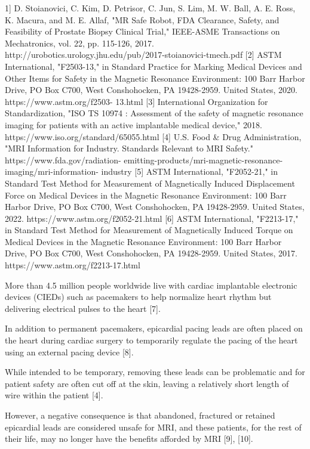 1] D. Stoianovici, C. Kim, D. Petrisor, C. Jun, S. Lim, M. W. Ball, A. E. Ross,
K. Macura, and M. E. Allaf, "MR Safe Robot, FDA Clearance, Safety, and
Feasibility of Prostate Biopsy Clinical Trial," IEEE-ASME Transactions on
Mechatronics, vol. 22, pp. 115-126, 2017.
http://urobotics.urology.jhu.edu/pub/2017-stoianovici-tmech.pdf
[2] ASTM International, "F2503-13," in Standard Practice for Marking
Medical Devices and Other Items for Safety in the Magnetic Resonance
Environment: 100 Barr Harbor Drive, PO Box C700, West Conshohocken,
PA 19428-2959. United States, 2020. https://www.astm.org/f2503-
13.html
[3] International Organization for Standardization, "ISO TS 10974 :
Assessment of the safety of magnetic resonance imaging for patients with
an active implantable medical device," 2018.
https://www.iso.org/standard/65055.html
[4] U.S. Food \& Drug Administration, "MRI Information for Industry.
Standards Relevant to MRI Safety." https://www.fda.gov/radiation-
emitting-products/mri-magnetic-resonance-imaging/mri-information-
industry
[5] ASTM International, "F2052-21," in Standard Test Method for
Measurement of Magnetically Induced Displacement Force on Medical
Devices in the Magnetic Resonance Environment: 100 Barr Harbor Drive,
PO Box C700, West Conshohocken, PA 19428-2959. United States, 2022.
https://www.astm.org/f2052-21.html
[6] ASTM International, "F2213-17," in Standard Test Method for
Measurement of Magnetically Induced Torque on Medical Devices in the
Magnetic Resonance Environment: 100 Barr Harbor Drive, PO Box C700,
West Conshohocken, PA 19428-2959. United States, 2017.
https://www.astm.org/f2213-17.html

More than 4.5 million people worldwide live with cardiac implantable electronic devices (CIEDs) such as pacemakers to
help normalize heart rhythm but delivering electrical pulses to the heart [7]. 

In addition to permanent pacemakers, epicardial
pacing leads are often placed on the heart during cardiac surgery to temporarily regulate the pacing of the heart using an
external pacing device [8]. 

While intended to be temporary, removing these leads can be problematic and for patient safety
are often cut off at the skin, leaving a relatively short length of wire within the patient [4].

 However, a negative consequence
is that abandoned, fractured or retained epicardial leads are considered unsafe for MRI, and these patients, for the rest of
their life, may no longer have the benefits afforded by MRI [9], [10]. 

